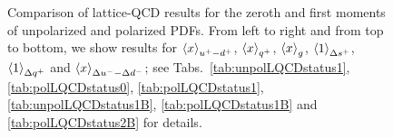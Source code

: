 \begin{figure}[!p]
\begin{center}
{
}
\end{center}
\caption{\small Comparison of lattice-QCD results for
  the zeroth and first moments
  of unpolarized and polarized PDFs.
  From left to right and from top to bottom, we show
  results for $\left\langle x\right\rangle_{u^+-d^+}$, $\left\langle x\right\rangle_{q^+}$, $\left\langle x\right\rangle_{g}$,
  $\left\langle 1 \right\rangle_{\Delta s^+}$, $\left\langle 1\right\rangle_{\Delta q^+}$ and
  $\left\langle x\right\rangle_{\Delta u^- - \Delta d^-}$;
  see Tabs.~\ref{tab:unpolLQCDstatus1}, \ref{tab:polLQCDstatus0},
  \ref{tab:polLQCDstatus1}, \ref{tab:unpolLQCDstatus1B},
  \ref{tab:polLQCDstatus1B} and \ref{tab:polLQCDstatus2B}
  for details.
}
\label{fig:latt_res}
\end{figure}






